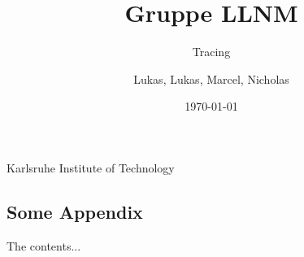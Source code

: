 \documentclass[11pt,a4paper,titlepage]{scrartcl}
\newcommand{\university}{Karlsruhe Institute of Technology}
\begin{document}

\title{Gruppe LLNM}
\subtitle{Tracing}
\author{Lukas, Lukas, Marcel, Nicholas}
\date{\today}

\graphicspath{{./images/}}

\makeatletter
\begin{titlepage}
	\centering
	{\LARGE \university \par}
	\vspace{5cm}
	{\LARGE \@title\par}
	\vspace{0.1cm}
	{\normalfont \@subtitle\par}
	\vspace{3cm}
	{\LARGE \@author\par}
	\vfill
	{\LARGE \@date\par}
\end{titlepage}
\makeatother
{}
\sffamily\tableofcontents
\clearpage
{}












\clearpage %
%



\clearpage
\begin{appendices}
\section{Some Appendix} %
The contents...
\end{appendices}
\end{document}
